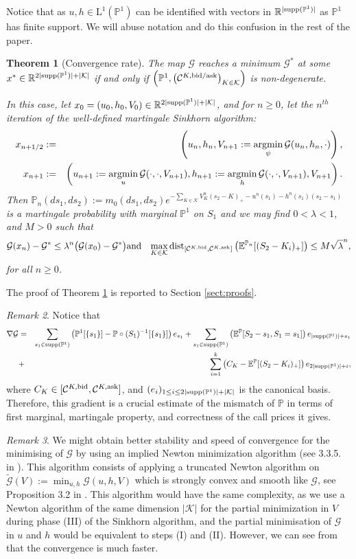 \documentclass{amsart}%
\newcommand{\argmin}{\operatornamewithlimits{argmin}}
\def\b*{\begin{eqnarray*}}
\def\e*{\end{eqnarray*}}
\def \E{\mathbb{E}}
\def \P{{\mathbb P}}
\def \R{\mathbb{R}}
\def\Cc{{\cal C}}
\def\Gc{{\cal G}}
\def\Kc{{\cal K}}
\def\no{\noindent}
\newtheorem{thm}{Theorem}[section]
\theoremstyle{definition}
\theoremstyle{remark}
\newtheorem{rem}[thm]{Remark}
\newcommand{\PP}{\mathbb{P}}
\newcommand{\cal}{\mathcal}
\newcommand{\LL}{{\mathrm L}}
\begin{document}
\no Notice that as $u,h\in \LL^1(\PP^1)$ can be identified with vectors in $\R^{|{\rm supp}(\P^1)|}$ as $\P^1$ has finite support. We will abuse notation and do this confusion in the rest of the paper.

\begin{thm}[Convergence rate]\label{thm:convergence}
The map $\Gc$ reaches a minimum $\Gc^*$ at some $x^*\in \R^{2|{\rm supp}(\P^1)|+|\Kc|}$ if and only if $\left(\P^1, \left(\Cc^{K,{\rm bid/ask}}\right)_{K\in\Kc}\right)$ is non-degenerate.

\no In this case, let $x_0 = (u_0,h_0,V_0)\in \R^{2|{\rm supp}(\P^1)|+|\Kc|}$, and for $n\ge 0$, let the $n^{th}$ iteration of the well-defined martingale Sinkhorn algorithm:
\b*
x_{n+1/2} &:=& \left(u_n,h_n,V_{n+1}:=\argmin_\psi \Gc(u_n,h_n,\cdot)\right),\\
x_{n+1} &:=& \left(u_{n+1}:=\argmin_u \Gc(\cdot,\cdot,V_{n+1}),h_{n+1}:=\argmin_h \Gc(\cdot,\cdot,V_{n+1}),V_{n+1}\right).
\e*
Then $\P_n(ds_1,ds_2):={m_0}(ds_1,ds_2) e^{- \sum_{K \in {\cal K}} V_K^n (s_{2}-K)_+-u^n(s_1) -h^n(s_1)(s_2-s_1)  }$ is a martingale probability with marginal $\P^1$ on $S_1$ and we may find $0<\lambda<1$, and $M>0$ such that
\b*
\Gc(x_n)-\Gc^*\le
\lambda^{n}\big(\Gc(x_0)-\Gc^*\big)&\mbox{and}& \max_{K\in\Kc}{\rm dist}_{[\Cc^{K,{\rm bid}},\Cc^{K,{\rm ask}}]}\left(\E^{\P_n}[(S_2-K_i)_+]\right)\le M\sqrt{\lambda}^n,
\e*
for all $n\ge 0$.
\end{thm}

\no The proof of Theorem \ref{thm:convergence} is reported to Section \ref{sect:proofs}.

\begin{rem}
Notice that
\b*
\nabla \Gc &=& \sum_{s_1\in{\rm supp}(\P^1)}\left(\P^1[\{s_1\}]-\P\circ (S_1)^{-1}[\{s_1\}]\right)e_{s_1}+\sum_{s_1\in{\rm supp}(\P^1)}\left(\E^\P[S_2-s_1,S_1=s_1]\right)e_{|{\rm supp}(\P^1)|+s_1}\\
&+&\sum_{i=1}^k\left(C_K-\E^\P[(S_2-K_i)_+]\right)e_{2|{\rm supp}(\P^1)|+i},
\e*
where $C_K\in[\Cc^{K,{\rm bid}},\Cc^{K,{\rm ask}}]$, and $(e_i)_{1\le i \le 2|{\rm supp}(\P^1)|+|\Kc|}$ is the canonical basis. Therefore, this gradient is a crucial estimate of the mismatch of $\P$ in terms of first marginal, martingale property, and correctness of the call prices it gives.
\end{rem}

\begin{rem}
We might obtain better stability and speed of convergence for the minimising of $\Gc$ by using an implied Newton minimization algorithm (see 3.3.5. in \cite{de2018entropic}). This algorithm consists of applying a truncated Newton algorithm on $\widetilde{\Gc}(V):= \min_{u,h}\Gc(u,h,V)$ which is strongly convex and smooth like $\Gc$, see Proposition 3.2 in \cite{de2018entropic}. This algorithm would have the same complexity, as we use a Newton algorithm of the same dimension $|\Kc|$ for the partial minimization in $V$ during phase (III) of the Sinkhorn algorithm, and the partial minimisation of $\Gc$ in $u$ and $h$ would be equivalent to steps (I) and (II). However, we can see from \cite{de2018entropic} that the convergence is much faster.
\end{rem}
\end{document}
